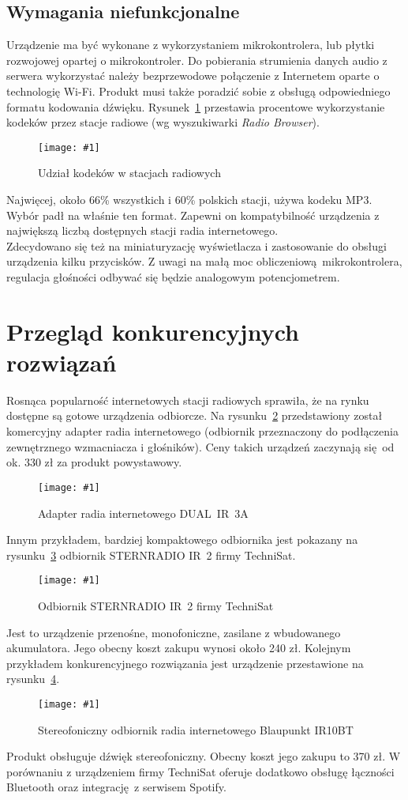 \documentclass[polish]{aghengthesis}
\newcommand{\imgint}[4]{
	\begin{figure}[{#4}]
		\centering
		\texttt{[image: \#1]}
		\caption{#2}
		\label{#1}
	\end{figure}
}
\newcommand{\imgh}[3]{\imgint{#1}{#2}{#3}{H}}
\begin{document}
		\subsection{Wymagania niefunkcjonalne}
			Urządzenie ma być wykonane z wykorzystaniem mikrokontrolera, lub płytki rozwojowej opartej o mikrokontroler.
			Do pobierania strumienia danych audio z serwera wykorzystać należy  bezprzewodowe połączenie z Internetem oparte o technologię Wi-Fi.
			Produkt musi także poradzić sobie z obsługą odpowiedniego formatu kodowania dźwięku.
			Rysunek~\ref{3/rb_chart_new} przestawia procentowe wykorzystanie kodeków przez stacje radiowe (wg wyszukiwarki \textit{Radio Browser}\textsuperscript{\cite{radio_browser_codecs}}).
			
			\imgh{3/rb_chart_new}{Udział kodeków w stacjach radiowych}{0.8}
			
			Najwięcej, około 66\% wszystkich i 60\% polskich stacji, używa kodeku MP3. Wybór padł na właśnie ten format.
			Zapewni on kompatybilność urządzenia z największą liczbą dostępnych stacji radia internetowego.
			$ $\\
			
			Zdecydowano się też na miniaturyzację wyświetlacza i zastosowanie do obsługi urządzenia kilku przycisków. Z uwagi na małą moc obliczeniową mikrokontrolera, regulacja głośności odbywać się będzie analogowym potencjometrem.
		
	\section{Przegląd konkurencyjnych rozwiązań}
		Rosnąca popularność internetowych stacji radiowych sprawiła, że na rynku dostępne są gotowe urządzenia odbiorcze.
		Na rysunku~\ref{1/radio_adapter} przedstawiony został komercyjny adapter radia internetowego (odbiornik przeznaczony do podłączenia zewnętrznego wzmacniacza i głośników). Ceny takich urządzeń zaczynają się od ok. 330 zł za produkt powystawowy. 
		\imgh{1/radio_adapter}{Adapter radia internetowego DUAL~IR~3A\textsuperscript{\cite{radio_adapter}}}{0.6}
		
		Innym przykładem, bardziej kompaktowego odbiornika jest pokazany na rysunku~\ref{1/radio_tanie} odbiornik STERNRADIO IR~2 firmy TechniSat.
		\imgh{1/radio_tanie}{Odbiornik STERNRADIO IR~2 firmy TechniSat\textsuperscript{\cite{radio_tanie}}}{0.4}
		Jest to urządzenie przenośne, monofoniczne, zasilane z wbudowanego akumulatora. Jego obecny koszt zakupu wynosi około 240 zł.
		Kolejnym przykładem konkurencyjnego rozwiązania jest urządzenie przestawione na rysunku~\ref{1/radio_drogie}.
		\imgh{1/radio_drogie}{Stereofoniczny odbiornik radia internetowego Blaupunkt IR10BT\textsuperscript{\cite{radio_drogie}}}{0.4}
		Produkt obsługuje dźwięk stereofoniczny. Obecny koszt jego zakupu to 370 zł. W porównaniu z urządzeniem firmy TechniSat oferuje dodatkowo obsługę łączności Bluetooth oraz integrację z serwisem Spotify.
		
\end{document}
